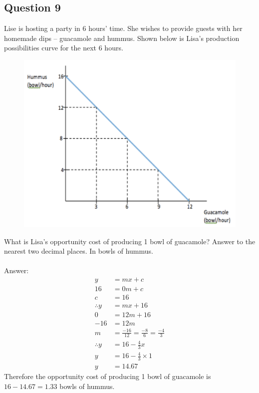\subsection{Question 9}
Lise is hosting a party in 6 hours' time. She wishes to provide guests with her homemade dips -- guacamole and hummus. Shown below is Lisa's production possibilities curve for the next 6 hours.
\begin{figure}[H]
	\centering
	\includegraphics[width=0.5\linewidth]{cml_1_9}
\end{figure}
\noindent What is Lisa's opportunity cost of producing 1 bowl of guacamole? Answer to the nearest two decimal places. In bowls of hummus.\\\\
Answer:
\begin{align*}
	y &= mx+c\\
	16 &= 0m+c\tag{Sub when $x$ is zero}\\
	c &= 16\\
	\therefore y &= mx + 16\\
	0 &= 12m + 16\tag{Sub when $y$ is zero}\\
	-16 &= 12m\\
	m &= \frac{-16}{12} = \frac{-8}{6} = \frac{-4}{3}\\
	\therefore y &= 16 - \frac{4}{3}x\\
	y&= 16 - \frac{4}{3}\times1\tag{Produce 1 bowl of guacamole}\\
	y &= 14.67
\end{align*}
Therefore the opportunity cost of producing 1 bowl of guacamole is $16 - 14.67 = 1.33$ bowls of hummus.

